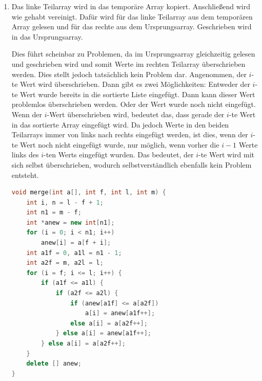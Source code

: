 \documentclass[11pt,a4paper]{article}
\begin{document}
\begin{loesung}
\begin{enumerate}
        \item 
        Das linke Teilarray wird in das temporäre Array kopiert. Anschließend wird wie gehabt vereinigt.
        Dafür wird für das linke Teilarray aus dem temporären Array gelesen und für das rechte aus dem Ursprungsarray.
        Geschrieben wird in das Ursprungsarray.

        Dies führt scheinbar zu Problemen, da im Ursprungsarray gleichzeitig gelesen und geschrieben wird und somit Werte im rechten Teilarray überschrieben werden.
        Dies stellt jedoch tatsächlich kein Problem dar.
        Angenommen, der $i$-te Wert wird überschrieben.
        Dann gibt es zwei Möglichkeiten: 
        Entweder der $i$-te Wert wurde bereits in die sortierte Liste eingefügt.
        Dann kann dieser Wert problemlos überschrieben werden.
        Oder der Wert wurde noch nicht eingefügt.
        Wenn der $i$-Wert überschrieben wird, bedeutet das, dass gerade der $i$-te Wert in das sortierte Array eingefügt wird.
        Da jedoch Werte in den beiden Teilarrays immer von links nach rechts eingefügt werden, ist dies, wenn der $i$-te Wert noch nicht eingefügt wurde, nur möglich, wenn vorher die $i - 1$ Werte links des $i$-ten Werts eingefügt wurden.
        Das bedeutet, der $i$-te Wert wird mit sich selbst überschrieben, wodurch selbstverständlich ebenfalls kein Problem entsteht.
        \begin{lstlisting}[language=c++]
void merge(int a[], int f, int l, int m) {
    int i, n = l - f + 1;
    int n1 = m - f;
    int *anew = new int[n1];
    for (i = 0; i < n1; i++)
        anew[i] = a[f + i];
    int a1f = 0, a1l = n1 - 1;
    int a2f = m, a2l = l;
    for (i = f; i <= l; i++) {
        if (a1f <= a1l) {
            if (a2f <= a2l) {
                if (anew[a1f] <= a[a2f])
                    a[i] = anew[a1f++];
                else a[i] = a[a2f++];
            } else a[i] = anew[a1f++];
        } else a[i] = a[a2f++];
    }
    delete [] anew;
}
        \end{lstlisting}

    \end{enumerate}
\end{loesung}
\end{document}
